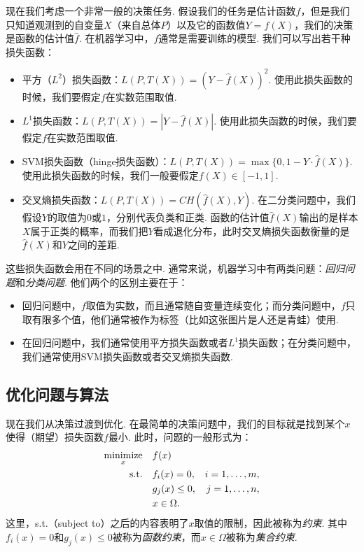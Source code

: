 现在我们考虑一个非常一般的决策任务. 假设我们的任务是估计函数$f$，但是我们只知道观测到的自变量$X$（来自总体$P$）以及它的函数值$Y=f(X)$，我们的决策是函数的估计值$\hat f$. 在机器学习中，$f$通常是需要训练的模型. 我们可以写出若干种损失函数：
\begin{itemize}
    \item 平方（$L^2$）损失函数：$L(P,T(X))=(Y-\hat f(X))^2$. 使用此损失函数的时候，我们要假定$f$在实数范围取值. 
    \item $L^1$损失函数：$L(P,T(X))=|Y-\hat f(X)|$. 使用此损失函数的时候，我们要假定$f$在实数范围取值. 
    \item SVM损失函数（hinge损失函数）：$L(P,T(X))=\max\{0,1-Y\cdot\hat f(X)\}$. 使用此损失函数的时候，我们一般要假定$f(X)\in[-1,1]$. 
    \item 交叉熵损失函数：$L(P,T(X))=CH(\hat f(X),Y)$. 在二分类问题中，我们假设$Y$的取值为$0$或$1$，分别代表负类和正类. 函数的估计值$\hat f (X)$输出的是样本$X$属于正类的概率，而我们把$Y$看成退化分布，此时交叉熵损失函数衡量的是$\hat f(X)$和$Y$之间的差距.
\end{itemize}

这些损失函数会用在不同的场景之中. 通常来说，机器学习中有两类问题：\textit{回归问题}和\textit{分类问题}. 他们两个的区别主要在于：
\begin{itemize}
    \item 回归问题中，$f$取值为实数，而且通常随自变量连续变化；而分类问题中，$f$只取有限多个值，他们通常被作为标签（比如这张图片是人还是青蛙）使用.
    \item 在回归问题中，我们通常使用平方损失函数或者$L^1$损失函数；在分类问题中，我们通常使用SVM损失函数或者交叉熵损失函数.
\end{itemize}

\subsection{优化问题与算法}
现在我们从决策过渡到优化. 在最简单的决策问题中，我们的目标就是找到某个$x$使得（期望）损失函数$f$最小. 此时，问题的一般形式为：
\begin{equation}
\begin{alignedat}{2}
\operatorname*{minimize}_{x}&\quad f(x)\\
\text{s.t.}&\quad f_i(x)=0,&\quad i=1,\dots,m,\\
&\quad g_j(x)\leq 0,&\quad j=1,\dots,n,\\
&\quad x\in\Omega.
\end{alignedat}
\label{eq:opt-general}
\end{equation}
这里，s.t.（subject to）之后的内容表明了$x$取值的限制，因此被称为\textit{约束}. 其中$f_i(x)=0$和$g_j(x)\leq 0$被称为\textit{函数约束}，而$x\in\Omega$被称为\textit{集合约束}.

